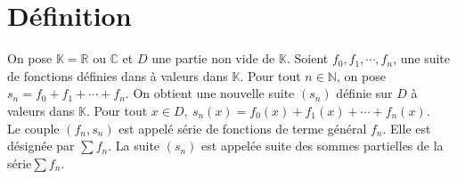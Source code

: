 \documentclass[11pt, a4paper]{book}
\begin{document}
\section{D\'efinition}
On pose $ \mathbb{K}=\mathbb{R}$ ou $ \mathbb{C}$ et $D$ une partie non vide de $ \mathbb{K}.$ Soient $f_0,f_1,\cdots,f_n$, une suite de fonctions d\'efinies dans \`a valeurs dans $ \mathbb{K}$. Pour tout $n\in \mathbb{N}$, on pose $s_n=f_0+f_1+\cdots+f_n.$ On obtient une nouvelle suite $(s_n)$ d\'efinie sur $D$ \`a valeurs dans $ \mathbb{K}.$ Pour tout $x\in D,~s_n(x)=f_0(x)+f_1(x)+\cdots+f_n(x).$\\
Le couple $(f_n,s_n)$ est appel\'e s\'erie de fonctions de terme g\'en\'eral $f_n$. Elle est d\'esign\'ee par $\sum f_n$. La suite $(s_n)$ est appel\'ee suite des sommes partielles de la s\'erie$\sum f_n$.\\
\end{document}
